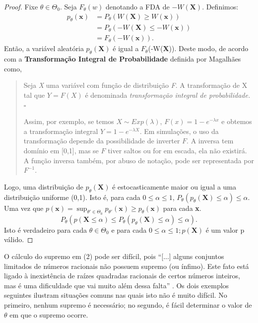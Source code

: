 \documentclass[10pt]{article}
\theoremstyle{plain}
\theoremstyle{remark}
\theoremstyle{definition}
\begin{document}
\begin{proof}
Fixe $\theta \in \Theta_{0}$. Seja $F_\theta(w)$ denotando a FDA de $-W(\textbf{X})$. Definimos:
\begin{align*}
    p_{ \theta }(\textbf{x}) &=P_{ \theta }(W(\textbf{X}) \geq W(\textbf{x})) \\
    &=P_{\theta}(-W(\textbf{X}) \leq -W(\textbf{x})) \\
    &= F_{ \theta }(-W(\textbf{x})).
\end{align*}
Então, a variável aleatória $p_{\theta}(\textbf{X})$ é igual a $F_{\theta}$(-W(\textbf{X})). Deste modo, de acordo com a \textbf{Transformação Integral de Probabilidade} definida por Magalhães \cite*[p.~150]{marco} como,
\begin{quote}
Seja \textit{X} uma variável com função de distribuição \textit{F}. A transformação de X tal que $Y=F(X)$ é denominada \textit{transformação integral de probabilidade.} \hfill $\square$

Assim, por exemplo, se temos $X \sim Exp(\lambda)$, $F(x)=1-e^{-\lambda x}$ e obtemos a transformação integral $Y=1-e^{-\lambda X}$. Em simulações, o uso da transformação depende da possibilidade de inverter $F$. A inversa tem domínio em [0,1], mas se $F$ tiver saltos ou for em escada, ela não existirá.
A função inversa também, por abuso de notação, pode ser representada por $F^{-1}$.
\end{quote}
Logo, uma distribuição de $p_{\theta}(\textbf{X})$ é estocasticamente maior ou igual a uma distribuição uniforme (0,1). Isto é, para cada $0 \leq \alpha \leq 1$, $P_{ \theta } (p_{ \theta }(\textbf{X})  \leq  \alpha ) \leq  \alpha$. Uma vez que $p(\textbf{x}) = \sup_{\theta' \in \Theta_{0}} p_{\theta'}(\textbf{x}) \geq p_{\theta}(\textbf{x})$ para cada \textbf{x}.
\begin{equation*}
    P_{\theta}(p(\textbf{X} \leq \alpha) \leq P_{\theta}(p_{\theta}(\textbf{X}) \leq \alpha) \leq \alpha).
\end{equation*}
Isto é verdadeiro para cada $\theta \in \Theta_{0}$ e para cada $0 \leq \alpha \leq 1; p(\textbf{X})$ é um valor p válido.
\end{proof}
O cálculo do supremo em (2) pode ser difícil, pois ``[...] alguns conjuntos limitados de números racionais não possuem supremo (ou 
ínfimo). Este fato está ligado à inexistência de raízes quadradas racionais de certos números inteiros, mas é uma dificuldade que vai muito além dessa falta'' \cite[p.~78]{lima2019curso}. Os dois exemplos seguintes ilustram situações comuns nas quais isto não é muito difícil. No primeiro, nenhum supremo é necessário; no segundo, é fácil determinar o valor de $\theta$ em que o supremo ocorre.
\end{document}
